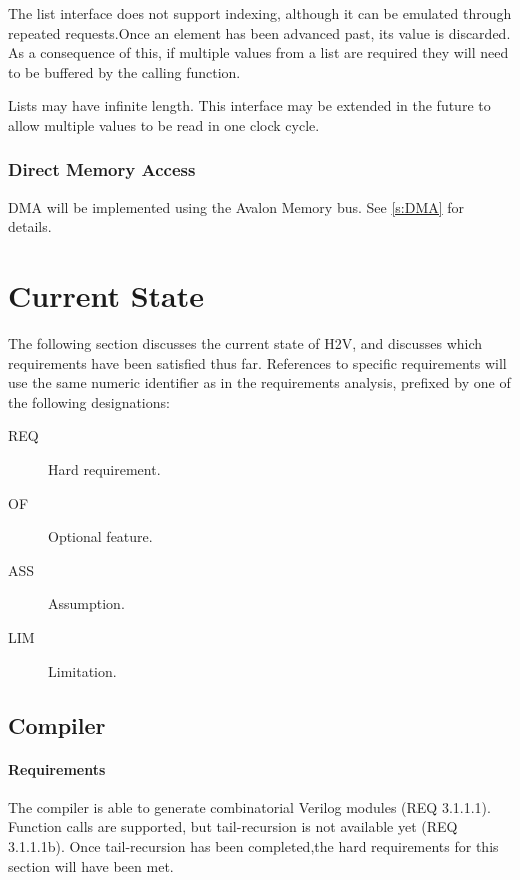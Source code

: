 \documentclass[english,onecolumn]{article}
\begin{document}
The list interface does not support indexing, although it can be emulated through repeated requests.\footnotemark Once an element has been advanced past, its value is discarded. As a consequence of this, if multiple values from a list are required they will need to be buffered by the calling function.

Lists may have infinite length. This interface may be extended in the future to allow multiple values to be read in one clock cycle.

\subsubsection{Direct Memory Access}
DMA will be implemented using the Avalon Memory bus. See \ref{s:DMA} for details.

\section{Current State}
The following section discusses the current state of H2V, and discusses which requirements have been satisfied thus far.
References to specific requirements will use the same numeric identifier as in the requirements analysis, prefixed by one of the following designations:

\begin{description}
        \item[REQ] Hard requirement.
        \item[OF] Optional feature.
        \item[ASS] Assumption.
        \item[LIM] Limitation.
\end{description}

\subsection{Compiler}
\paragraph{Requirements}
The compiler is able to generate combinatorial Verilog modules (REQ 3.1.1.1). Function calls are supported, but tail-recursion is not available yet (REQ 3.1.1.1b).
Once tail-recursion has been completed,\footnotemark the hard requirements for this section will have been met.
\end{document}
